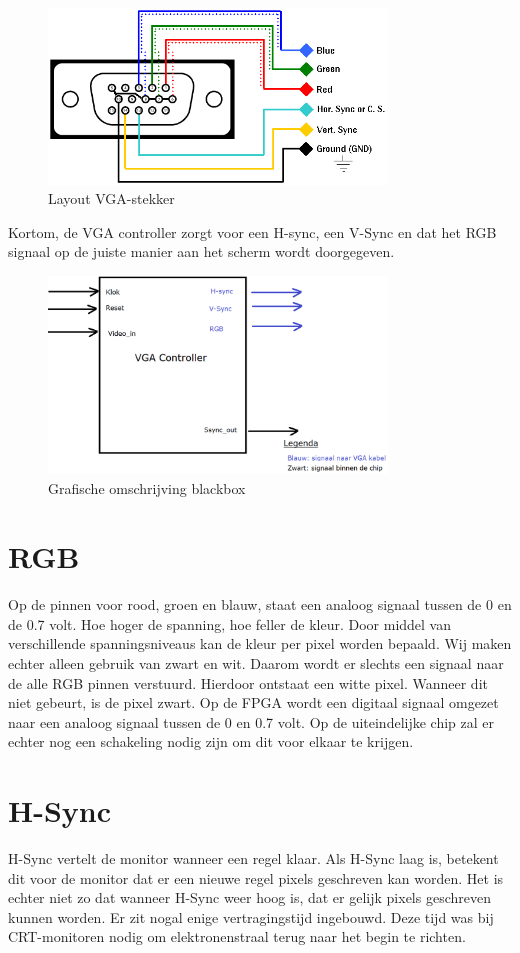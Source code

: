 \documentclass[oneside,dutch]{tudelft-report}
\begin{document}
\begin{figure}[H]
\center
\includegraphics[width=9cm]{vga2arcade}
\caption{Layout VGA-stekker}
\label{VGA}
\end{figure}

Kortom, de VGA controller zorgt voor een H-sync, een V-Sync en dat het RGB signaal op de juiste manier aan het scherm wordt doorgegeven. 

\begin{figure}[H]
\center
\includegraphics[width=9cm]{totaal-overzicht}
\caption{Grafische omschrijving blackbox}
\label{VGA}
\end{figure}

\section{RGB}
Op de pinnen voor rood, groen en blauw, staat een analoog signaal tussen de 0 en de 0.7 volt. Hoe hoger de spanning, hoe feller de kleur. Door middel van verschillende spanningsniveaus kan de kleur per pixel worden bepaald. Wij maken echter alleen gebruik van zwart en wit. Daarom wordt er slechts een signaal naar de alle RGB pinnen verstuurd. Hierdoor ontstaat een witte pixel. Wanneer dit niet gebeurt, is de pixel zwart. Op de FPGA wordt een digitaal signaal omgezet naar een analoog signaal tussen de 0 en 0.7 volt. Op de uiteindelijke chip zal er echter nog een schakeling nodig zijn om dit voor elkaar te krijgen. 

\section{H-Sync}
H-Sync vertelt de monitor wanneer een regel klaar. Als H-Sync laag is, betekent dit voor de monitor dat er een nieuwe regel pixels geschreven kan worden. Het is echter niet zo dat wanneer H-Sync weer hoog is, dat er gelijk pixels geschreven kunnen worden. Er zit nogal enige vertragingstijd ingebouwd. Deze tijd was bij CRT-monitoren nodig om elektronenstraal terug naar het begin te richten.
\end{document}

